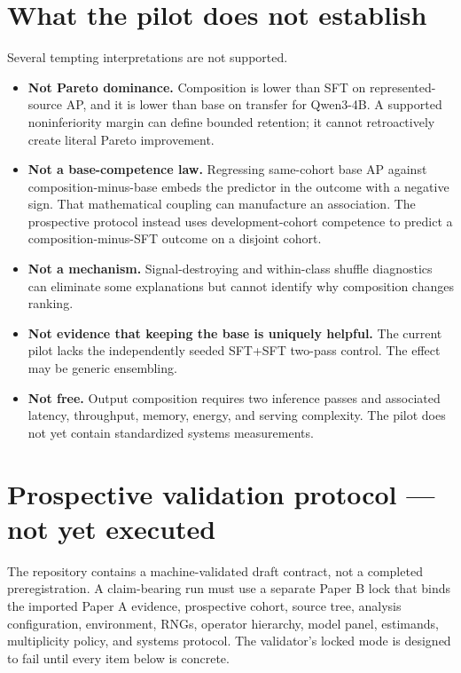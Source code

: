 \documentclass[11pt]{article}
\begin{document}
\section{What the pilot does not establish}
\label{sec:not-establish}

Several tempting interpretations are not supported.

\begin{itemize}[leftmargin=1.5em]
  \item \textbf{Not Pareto dominance.} Composition is lower than SFT on represented-source AP,
  and it is lower than base on transfer for Qwen3-4B.  A supported noninferiority margin can define
  bounded retention; it cannot retroactively create literal Pareto improvement.

  \item \textbf{Not a base-competence law.} Regressing same-cohort base AP against
  composition-minus-base embeds the predictor in the outcome with a negative sign.  That
  mathematical coupling can manufacture an association.  The prospective protocol instead uses
  development-cohort competence to predict a composition-minus-SFT outcome on a disjoint cohort.

  \item \textbf{Not a mechanism.} Signal-destroying and within-class shuffle diagnostics can
  eliminate some explanations but cannot identify why composition changes ranking.

  \item \textbf{Not evidence that keeping the base is uniquely helpful.} The current pilot lacks
  the independently seeded SFT+SFT two-pass control.  The effect may be generic ensembling.

  \item \textbf{Not free.} Output composition requires two inference passes and associated
  latency, throughput, memory, energy, and serving complexity.  The pilot does not yet contain
  standardized systems measurements.
\end{itemize}

\section{Prospective validation protocol --- not yet executed}
\label{sec:prospective}

The repository contains a machine-validated draft contract, not a completed preregistration.  A
claim-bearing run must use a separate Paper B lock that binds the imported Paper A evidence,
prospective cohort, source tree, analysis configuration, environment, RNGs, operator hierarchy,
model panel, estimands, multiplicity policy, and systems protocol.  The validator's locked mode is
designed to fail until every item below is concrete.
\end{document}
